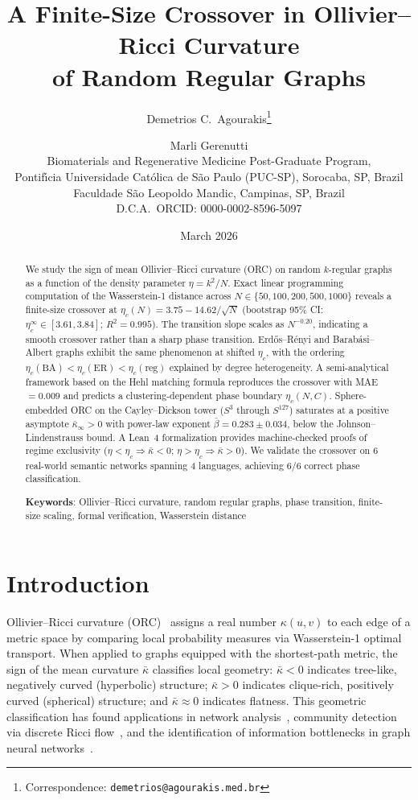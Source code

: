 \documentclass[11pt,a4paper]{article}
\title{A Finite-Size Crossover in Ollivier--Ricci Curvature\\of Random Regular Graphs}
\author{%
  Demetrios C.\ Agourakis\thanks{Correspondence: \texttt{demetrios@agourakis.med.br}}%
  \and
  Marli Gerenutti%
  \\[6pt]
  \small Biomaterials and Regenerative Medicine Post-Graduate Program,\\
  \small Pontif\'{\i}cia Universidade Cat\'olica de S\~ao Paulo (PUC-SP),
         Sorocaba, SP, Brazil\\
  \small Faculdade S\~ao Leopoldo Mandic, Campinas, SP, Brazil\\[3pt]
  \small D.C.A.\ ORCID: 0000-0002-8596-5097
}
\date{March 2026}
\newcommand{\kbar}{\bar{\kappa}}
\newcommand{\etac}{\eta_c}
\begin{document}
\maketitle

\begin{abstract}
We study the sign of mean Ollivier--Ricci curvature (ORC) on random $k$-regular graphs as a function of the density parameter $\eta = k^2/N$. Exact linear programming computation of the Wasserstein-1 distance across $N \in \{50, 100, 200, 500, 1000\}$ reveals a finite-size crossover at $\etac(N) = 3.75 - 14.62/\sqrt{N}$ (bootstrap 95\% CI: $\eta_c^\infty \in [3.61, 3.84]$; $R^2 = 0.995$). The transition slope scales as $N^{-0.20}$, indicating a smooth crossover rather than a sharp phase transition. Erd\H{o}s--R\'enyi and Barab\'asi--Albert graphs exhibit the same phenomenon at shifted $\etac$, with the ordering $\etac(\mathrm{BA}) < \etac(\mathrm{ER}) < \etac(\mathrm{reg})$ explained by degree heterogeneity. A semi-analytical framework based on the Hehl matching formula reproduces the crossover with MAE~$= 0.009$ and predicts a clustering-dependent phase boundary $\etac(N, C)$. Sphere-embedded ORC on the Cayley--Dickson tower ($S^3$ through $S^{127}$) saturates at a positive asymptote $\kbar_\infty > 0$ with power-law exponent $\bar{\beta} = 0.283 \pm 0.034$, below the Johnson--Lindenstrauss bound. A Lean~4 formalization provides machine-checked proofs of regime exclusivity ($\eta < \etac \Rightarrow \kbar < 0$; $\eta > \etac \Rightarrow \kbar > 0$). We validate the crossover on 6 real-world semantic networks spanning 4 languages, achieving 6/6 correct phase classification.

\medskip\noindent
\textbf{Keywords}: Ollivier--Ricci curvature, random regular graphs, phase transition, finite-size scaling, formal verification, Wasserstein distance
\end{abstract}

\section{Introduction}
\label{sec:intro}

Ollivier--Ricci curvature (ORC)~\cite{ollivier2009ricci} assigns a real number $\kappa(u,v)$ to each edge of a metric space by comparing local probability measures via Wasserstein-1 optimal transport. When applied to graphs equipped with the shortest-path metric, the sign of the mean curvature $\kbar$ classifies local geometry: $\kbar < 0$ indicates tree-like, negatively curved (hyperbolic) structure; $\kbar > 0$ indicates clique-rich, positively curved (spherical) structure; and $\kbar \approx 0$ indicates flatness. This geometric classification has found applications in network analysis~\cite{ni2015ricci,sandhu2015graph,sia2021forman}, community detection via discrete Ricci flow~\cite{ni2019community}, and the identification of information bottlenecks in graph neural networks~\cite{topping2022over}.
\end{document}
